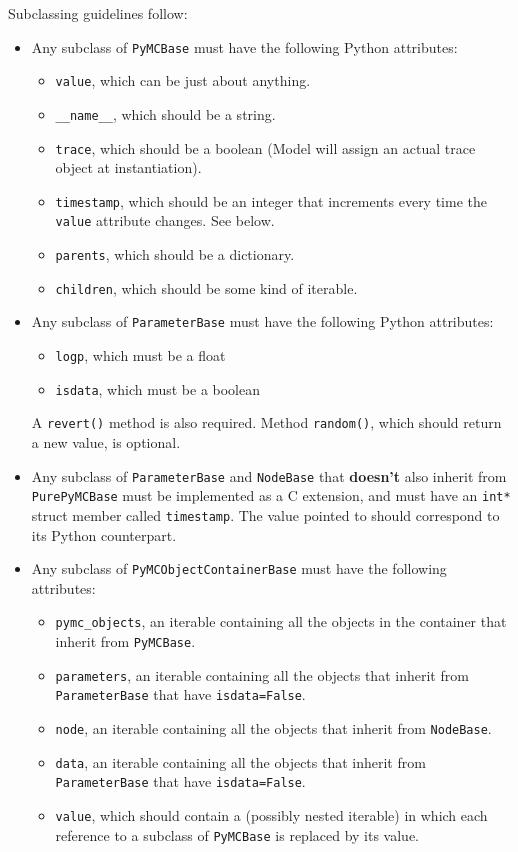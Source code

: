 \documentclass[]{book}
\begin{document}
Subclassing guidelines follow:
\begin{itemize}
	\item Any subclass of \texttt{PyMCBase} must have the following Python attributes:
	\begin{itemize}
		\item \texttt{value}, which can be just about anything.
		\item \texttt{\_\_name\_\_}, which should be a string.
		\item \texttt{trace}, which should be a boolean (Model will assign an actual trace object at instantiation).
		\item \texttt{timestamp}, which should be an integer that increments every time the \texttt{value} attribute changes. See below.
		\item \texttt{parents}, which should be a dictionary.
		\item \texttt{children}, which should be some kind of iterable.
	\end{itemize}
	\item Any subclass of \texttt{ParameterBase}  must have the following Python attributes:
	\begin{itemize}
		\item \texttt{logp}, which must be a float
		\item \texttt{isdata}, which must be a boolean  
	\end{itemize} A \texttt{revert()} method is also required. Method \texttt{random()}, which should return a new value, is optional.
	\item Any subclass of \texttt{ParameterBase} and \texttt{NodeBase} that \textbf{doesn't} also inherit from \texttt{PurePyMCBase} must be implemented as a C extension, and must have an \texttt{int*} struct member called \texttt{timestamp}. The value pointed to should correspond to its Python counterpart. 
	\item Any subclass of \texttt{PyMCObjectContainerBase} must have the following attributes:
	\begin{itemize}
		\item \texttt{pymc\_objects}, an iterable containing all the objects in the container that inherit from \texttt{PyMCBase}.
		\item \texttt{parameters}, an iterable containing all the objects that inherit from \texttt{ParameterBase} that have \texttt{isdata=False}.
		\item \texttt{node}, an iterable containing all the objects that inherit from \texttt{NodeBase}.
		\item \texttt{data}, an iterable containing all the objects that inherit from \texttt{ParameterBase} that have \texttt{isdata=False}.
		\item \texttt{value}, which should contain a (possibly nested iterable) in which each reference to a subclass of \texttt{PyMCBase} is replaced by its value. 
	\end{itemize}
\end{itemize}
\end{document}
